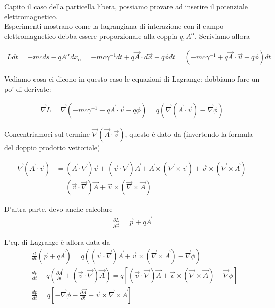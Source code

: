 \documentclass{report}
\begin{document}
Capito il caso della particella libera, possiamo provare ad inserire il potenziale elettromagnetico. \\
Esperimenti mostrano come la lagrangiana di interazione con il campo elettromagnetico debba essere proporzionale alla coppia \(q, A^\alpha\). Scriviamo allora 

\begin{align}
    L dt = -mcds - qA^\alpha dx_\alpha = -mc\gamma^{-1}dt + q \vec{A}\cdot d\vec{x} - q \phi dt = (-mc\gamma^{-1} +q\vec{A}\cdot \vec{v} - q\phi)dt
\end{align}

Vediamo cosa ci dicono in questo caso le equazioni di Lagrange: dobbiamo fare un po' di derivate: 

\begin{align}
    \vec{\nabla}L= \vec{\nabla}\left(-mc\gamma^{-1} +q\vec{A}\cdot \vec{v} - q\phi \right) = q(\vec{\nabla}(\vec{A}\cdot\vec{v}) - \vec{\nabla}\phi)
\end{align}

Concentriamoci sul termine \(\vec{\nabla}(\vec{A}\cdot \vec{v})\), questo è dato da (invertendo la formula del doppio prodotto vettoriale)

\begin{align}
    \vec{\nabla}(\vec{A}\cdot \vec{v}) &= (\vec{A}\cdot \vec{\nabla})\vec{v} + (\vec{v}\cdot \vec{\nabla})\vec{A} + \vec{A}\times (\vec{\nabla}\times \vec{v}) + \vec{v}\times (\vec{\nabla}\times \vec{A}) \\
    &= (\vec{v}\cdot \vec{\nabla})\vec{A} + \vec{v}\times (\vec{\nabla}\times \vec{A})
\end{align}

D'altra parte, devo anche calcolare 
\begin{align}
    \frac{\partial L}{\partial \vec{v}} = \vec{p} + q\vec{A}
\end{align}

L'eq. di Lagrange è allora data da
\begin{align}
    &\frac{d}{dt}(\vec{p} + q\vec{A}) = q((\vec{v}\cdot \vec{\nabla})\vec{A} + \vec{v}\times (\vec{\nabla}\times \vec{A}) -\vec{\nabla}\phi) \\
    &\frac{dp}{dt} +q\left(\frac{\partial \vec{A}}{\partial t} + (\vec{v}\cdot \vec{\nabla})\vec{A}\right) = q[(\vec{v}\cdot \vec{\nabla})\vec{A} + \vec{v}\times (\vec{\nabla}\times \vec{A}) - \vec{\nabla}\phi] \\
    &\frac{dp}{dt} = q\left[-\vec{\nabla}\phi - \frac{\partial \vec{A}}{\partial t}+ \vec{v}\times \vec{\nabla}\times \vec{A}\right]
\end{align}
\end{document}
